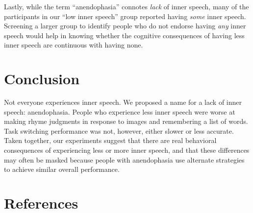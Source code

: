 \documentclass[
  man,a4paper,floatsintext]{apa6}
\begin{document}
Lastly, while the term ``anendophasia'' connotes \emph{lack} of inner speech, many of the participants in our ``low inner speech'' group reported having \emph{some} inner speech. Screening a larger group to identify people who do not endorse having \emph{any} inner speech would help in knowing whether the cognitive consequences of having less inner speech are continuous with having none.

\hypertarget{conclusion}{%
\section{Conclusion}\label{conclusion}}

Not everyone experiences inner speech. We proposed a name for a lack of inner speech: anendophasia. People who experience less inner speech were worse at making rhyme judgments in response to images and remembering a list of words. Task switching performance was not, however, either slower or less accurate. Taken together, our experiments suggest that there are real behavioral consequences of experiencing less or more inner speech, and that these differences may often be masked because people with anendophasia use alternate strategies to achieve similar overall performance.

\newpage

\hypertarget{references}{%
\section{References}\label{references}}
\end{document}

